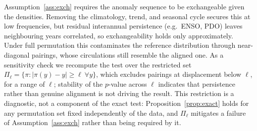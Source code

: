 \begin{remark}
\label{rem:persistence}
Assumption~\ref{ass:exch} requires the anomaly sequence to be exchangeable given
the densities. Removing the climatology, trend, and seasonal cycle secures this
at low frequencies, but residual interannual persistence (e.g.\ ENSO, PDO) leaves
neighbouring years correlated, so exchangeability holds only approximately. Under
full permutation this contaminates the reference distribution through near-diagonal
pairings, whose circulations still resemble the aligned one. As a sensitivity
check we recompute the test over the restricted set
$\Pi_\ell = \{\pi : |\pi(y)-y| \ge \ell\ \forall y\}$, which excludes pairings at
displacement below $\ell$, for a range of $\ell$; stability of the $p$-value
across $\ell$ indicates that persistence rather than genuine alignment is not
driving the result. This restriction is a diagnostic, not a component of the exact
test: Proposition~\ref{prop:exact} holds for any permutation set fixed
independently of the data, and $\Pi_\ell$ mitigates a failure of
Assumption~\ref{ass:exch} rather than being required by it.
\end{remark}

